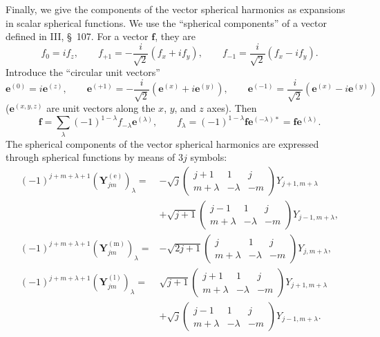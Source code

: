 Finally, we give the components of the vector spherical harmonics as expansions in scalar spherical functions. We use the ``spherical components'' of a vector defined in III, \S~107. For a vector $\mathbf f$, they are
\begin{equation}
f_0=if_z,
\qquad
f_{+1}=-\frac{i}{\sqrt2}(f_x+if_y),
\qquad
f_{-1}=\frac{i}{\sqrt2}(f_x-if_y).
\tag{7.13}
\end{equation}
Introduce the ``circular unit vectors''
\begin{equation}
\mathbf e^{(0)}=i\mathbf e^{(z)},
\qquad
\mathbf e^{(+1)}=-\frac{i}{\sqrt2}(\mathbf e^{(x)}+i\mathbf e^{(y)}),
\qquad
\mathbf e^{(-1)}=\frac{i}{\sqrt2}(\mathbf e^{(x)}-i\mathbf e^{(y)})
\tag{7.14}
\end{equation}
($\mathbf e^{(x,y,z)}$ are unit vectors along the $x$, $y$, and $z$ axes). Then
\begin{equation}
\mathbf f=\sum_\lambda(-1)^{1-\lambda}f_{-\lambda}\mathbf e^{(\lambda)},
\qquad
f_\lambda=(-1)^{1-\lambda}\mathbf f\mathbf e^{(-\lambda)*}
=\mathbf f\mathbf e^{(\lambda)}.
\tag{7.15}
\end{equation}
The spherical components of the vector spherical harmonics are expressed through spherical functions by means of $3j$ symbols:
\begin{equation}
\begin{aligned}
(-1)^{j+m+\lambda+1}(\mathbf Y^{(\text{e})}_{jm})_\lambda
={}&-\sqrt j
\begin{pmatrix}j+1&1&j\\m+\lambda&-\lambda&-m\end{pmatrix}
Y_{j+1,m+\lambda}\\
&+\sqrt{j+1}
\begin{pmatrix}j-1&1&j\\m+\lambda&-\lambda&-m\end{pmatrix}
Y_{j-1,m+\lambda},\\
(-1)^{j+m+\lambda+1}(\mathbf Y^{(\text{m})}_{jm})_\lambda
={}&-\sqrt{2j+1}
\begin{pmatrix}j&1&j\\m+\lambda&-\lambda&-m\end{pmatrix}
Y_{j,m+\lambda},\\
(-1)^{j+m+\lambda+1}(\mathbf Y^{(\text{l})}_{jm})_\lambda
={}&\sqrt{j+1}
\begin{pmatrix}j+1&1&j\\m+\lambda&-\lambda&-m\end{pmatrix}
Y_{j+1,m+\lambda}\\
&+\sqrt j
\begin{pmatrix}j-1&1&j\\m+\lambda&-\lambda&-m\end{pmatrix}
Y_{j-1,m+\lambda}.
\end{aligned}
\tag{7.16}
\end{equation}


